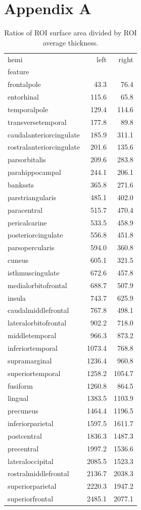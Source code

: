 \documentclass{article}
\begin{document}
\section{Appendix A}\label{sec:appendix-a}



\begin{table}[H]
\centering
\caption{Ratios of ROI surface area divided by ROI average thickness.}\label{tab:sa-ratios}
\begin{tabular}{lrr}
\toprule
hemi & left & right \\
feature &  &  \\
\midrule
frontalpole & 43.3 & 76.4 \\
entorhinal & 115.6 & 65.8 \\
temporalpole & 129.4 & 114.6 \\
transversetemporal & 177.8 & 89.8 \\
caudalanteriorcingulate & 185.9 & 311.1 \\
rostralanteriorcingulate & 201.6 & 135.6 \\
parsorbitalis & 209.6 & 283.8 \\
parahippocampal & 244.1 & 206.1 \\
bankssts & 365.8 & 271.6 \\
parstriangularis & 485.1 & 402.0 \\
paracentral & 515.7 & 470.4 \\
pericalcarine & 533.5 & 458.9 \\
posteriorcingulate & 556.8 & 451.8 \\
parsopercularis & 594.0 & 360.8 \\
cuneus & 605.1 & 321.5 \\
isthmuscingulate & 672.6 & 457.8 \\
medialorbitofrontal & 688.7 & 507.9 \\
insula & 743.7 & 625.9 \\
caudalmiddlefrontal & 767.8 & 498.1 \\
lateralorbitofrontal & 902.2 & 718.0 \\
middletemporal & 966.3 & 873.2 \\
inferiortemporal & 1073.4 & 768.8 \\
supramarginal & 1236.4 & 960.8 \\
superiortemporal & 1258.2 & 1054.7 \\
fusiform & 1260.8 & 864.5 \\
lingual & 1383.5 & 1103.9 \\
precuneus & 1464.4 & 1196.5 \\
inferiorparietal & 1597.5 & 1611.7 \\
postcentral & 1836.3 & 1487.3 \\
precentral & 1997.2 & 1536.6 \\
lateraloccipital & 2085.5 & 1523.3 \\
rostralmiddlefrontal & 2136.7 & 2038.3 \\
superiorparietal & 2220.3 & 1947.2 \\
superiorfrontal & 2485.1 & 2077.1 \\
\bottomrule
\end{tabular}
\end{table}
\end{document}
